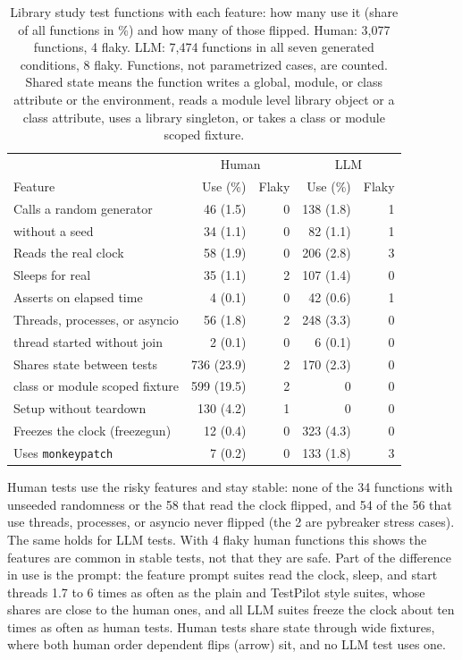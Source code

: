 \begin{table}[htbp]
\caption{Library study test functions with each feature: how many use it (share of all functions in \%) and how many of those flipped. Human: 3,077 functions, 4 flaky. LLM: 7,474 functions in all seven generated conditions, 8 flaky. Functions, not parametrized cases, are counted. Shared state means the function writes a global, module, or class attribute or the environment, reads a module level library object or a class attribute, uses a library singleton, or takes a class or module scoped fixture.}
\label{tab:features}
\small
\setlength{\tabcolsep}{2.5pt}
\begin{tabularx}{\columnwidth}{Xrrrr}
\toprule
 & \multicolumn{2}{c}{Human} & \multicolumn{2}{c}{LLM} \\
Feature & Use (\%) & Flaky & Use (\%) & Flaky \\
\midrule
Calls a random generator & 46 (1.5) & 0 & 138 (1.8) & 1 \\
\quad without a seed & 34 (1.1) & 0 & 82 (1.1) & 1 \\
Reads the real clock & 58 (1.9) & 0 & 206 (2.8) & 3 \\
Sleeps for real & 35 (1.1) & 2 & 107 (1.4) & 0 \\
Asserts on elapsed time & 4 (0.1) & 0 & 42 (0.6) & 1 \\
Threads, processes, or asyncio & 56 (1.8) & 2 & 248 (3.3) & 0 \\
\quad thread started without join & 2 (0.1) & 0 & 6 (0.1) & 0 \\
Shares state between tests & 736 (23.9) & 2 & 170 (2.3) & 0 \\
\quad class or module scoped fixture & 599 (19.5) & 2 & 0 & 0 \\
Setup without teardown & 130 (4.2) & 1 & 0 & 0 \\
Freezes the clock (freezegun) & 12 (0.4) & 0 & 323 (4.3) & 0 \\
Uses \texttt{monkeypatch} & 7 (0.2) & 0 & 133 (1.8) & 3 \\
\bottomrule
\end{tabularx}
\end{table}

Human tests use the risky features and stay stable: none of the 34 functions with unseeded randomness or the 58 that read the clock flipped, and 54 of the 56 that use threads, processes, or asyncio never flipped (the 2 are pybreaker stress cases). The same holds for LLM tests. With 4 flaky human functions this shows the features are common in stable tests, not that they are safe. Part of the difference in use is the prompt: the feature prompt suites read the clock, sleep, and start threads 1.7 to 6 times as often as the plain and TestPilot style suites, whose shares are close to the human ones, and all LLM suites freeze the clock about ten times as often as human tests. Human tests share state through wide fixtures, where both human order dependent flips (arrow) sit, and no LLM test uses one.

